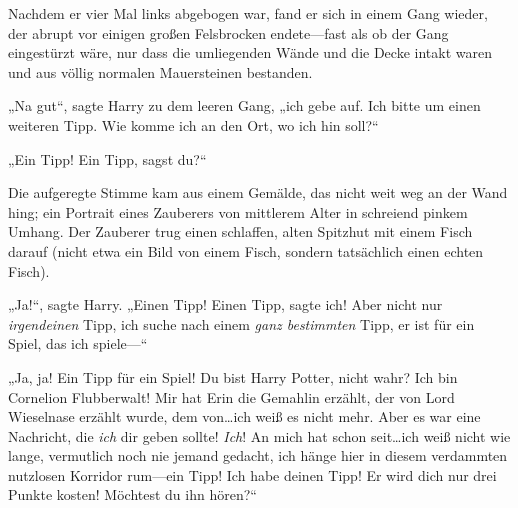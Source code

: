 Nachdem er vier Mal links abgebogen war, fand er sich in einem Gang wieder, der abrupt vor einigen großen Felsbrocken endete—fast als ob der Gang eingestürzt wäre, nur dass die umliegenden Wände und die Decke intakt waren und aus völlig normalen Mauersteinen bestanden.

„Na gut“, sagte Harry zu dem leeren Gang, „ich gebe auf. Ich bitte um einen weiteren Tipp. Wie komme ich an den Ort, wo ich hin soll?“

„Ein Tipp! Ein Tipp, sagst du?“

Die aufgeregte Stimme kam aus einem Gemälde, das nicht weit weg an der Wand hing; ein Portrait eines Zauberers von mittlerem Alter in schreiend pinkem Umhang. Der Zauberer trug einen schlaffen, alten Spitzhut mit einem Fisch darauf (nicht etwa ein Bild von einem Fisch, sondern tatsächlich einen echten Fisch).

„Ja!“, sagte Harry. „Einen Tipp! Einen Tipp, sagte ich! Aber nicht nur \emph{irgendeinen} Tipp, ich suche nach einem \emph{ganz bestimmten} Tipp, er ist für ein Spiel, das ich spiele—“

„Ja, ja! Ein Tipp für ein Spiel! Du bist Harry Potter, nicht wahr? Ich bin Cornelion Flubberwalt! Mir hat Erin die Gemahlin erzählt, der von Lord Wieselnase erzählt wurde, dem von…ich weiß es nicht mehr. Aber es war eine Nachricht, die \emph{ich} dir geben sollte! \emph{Ich}! An mich hat schon seit…ich weiß nicht wie lange, vermutlich noch nie jemand gedacht, ich hänge hier in diesem verdammten nutzlosen Korridor rum—ein Tipp! Ich habe deinen Tipp! Er wird dich nur drei Punkte kosten! Möchtest du ihn hören?“

